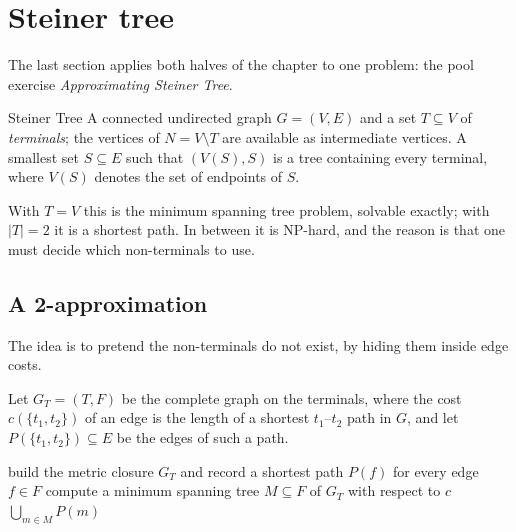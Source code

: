 \section{Steiner tree}
\label{sec:steiner-tree}

The last section applies both halves of the chapter to one problem: the pool
exercise \emph{Approximating Steiner Tree}.

\begin{probdef}{Steiner Tree}
  \instance A connected undirected graph $G = (V,E)$ and a set $T \subseteq V$
  of \emph{terminals}; the vertices of $N = V \setminus T$ are available as
  intermediate vertices.
  \question A smallest set $S \subseteq E$ such that $(V(S),S)$ is a tree
  containing every terminal, where $V(S)$ denotes the set of endpoints of $S$.
\end{probdef}

With $T = V$ this is the minimum spanning tree problem, solvable exactly; with
$|T| = 2$ it is a shortest path. In between it is \textrm{NP}-hard, and the
reason is that one must decide which non-terminals to use.

\subsection{A 2-approximation}

The idea is to pretend the non-terminals do not exist, by hiding them inside
edge costs.

\begin{definition}\label{def:metric-closure}
Let $G_T = (T,F)$ be the complete graph on the terminals, where the cost
$c(\{t_1,t_2\})$ of an edge is the length of a shortest $t_1$--$t_2$ path in
$G$, and let $P(\{t_1,t_2\}) \subseteq E$ be the edges of such a path.
\end{definition}

\begin{algorithm}[ht]
\caption{MST heuristic for }
\label{alg:steiner-mst}
\begin{algorithmic}[1]
  \State build the metric closure $G_T$ and record a shortest path $P(f)$ for
         every edge $f \in F$
  \State compute a minimum spanning tree $M \subseteq F$ of $G_T$ with respect
         to $c$
  \State \Return $\bigcup_{m \in M} P(m)$
\end{algorithmic}
\end{algorithm}

